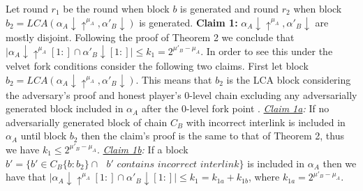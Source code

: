 \documentclass[11pt,a4paper]{article}
\begin{document}
Let round $r_1$ be the round when block $b$ is generated and round $r_2$ when block $b_2 = LCA(\alpha_A \downarrow \uparrow^{\mu_A}, \alpha'_B\downarrow)$ is generated.
\textbf{Claim 1:} $\alpha_A \downarrow \uparrow^{\mu_A}, \alpha'_B\downarrow$ are mostly disjoint. Following the proof of Theorem 2 we conclude that $\vert \alpha_A\downarrow\uparrow^{\mu_A}[1:] \cap \alpha'_B\downarrow[1:] \vert \leq k_{1} = 2^{\mu'_B - \mu_A}$. In order to see this under the velvet fork conditions consider the following two claims. First let block $b_2 = LCA(\alpha_A \downarrow \uparrow^{\mu_A}, \alpha'_B\downarrow)$. This means that $b_2$ is the LCA block considering the adversary's proof and honest player's 0-level chain excluding any adversarially generated block included in $\alpha_A$ after the 0-level fork point .
\textit{\underline{Claim 1a}:} If no adversarially generated block of chain $C_B$ with incorrect interlink is included in $\alpha_A$ until block $b_2$ then the claim's proof is the same to that of Theorem 2, thus we have $k_1 \leq 2^{\mu'_B - \mu_A}$.
\textit{\underline{Claim 1b}:}  If a block $b' = \{b' \in C_B\{b:b_2\} \cap \textit{ } b' \textit{ contains incorrect interlink} \}$ is included in $\alpha_A$ then we have that $\vert \alpha_A\downarrow\uparrow^{\mu_A}[1:] \cap \alpha'_B\downarrow[1:] \vert \leq k_1 = k_{1a} + k_{1b}$, where $ k_{1a} = 2^{\mu'_B - \mu_A}$. 
	
\end{document}
